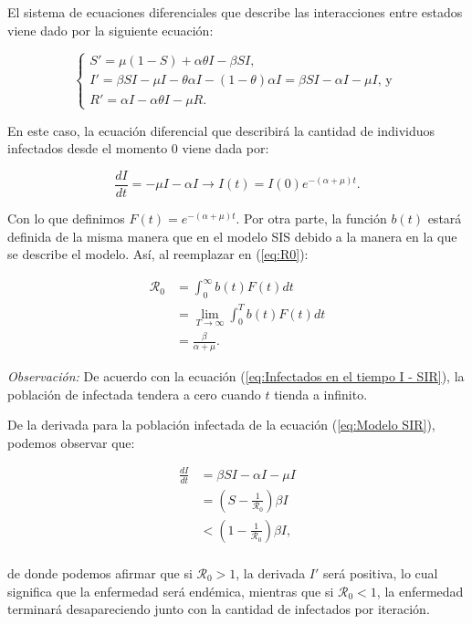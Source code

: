 El sistema de ecuaciones diferenciales que describe las interacciones entre estados viene dado por la siguiente ecuación:

\begin{equation}\label{eq:Modelo SIR}
\left\{
\begin{array}{l}
S' = \mu(1 - S) + \alpha\theta I - \beta S I, \\
I' = \beta S I - \mu I - \theta\alpha I - (1 - \theta)\alpha I = \beta S I - \alpha I - \mu I\text{, y } \\
R' = \alpha I - \alpha\theta I - \mu R.
\end{array}
\right.
\end{equation}

En este caso, la ecuación diferencial que describirá la cantidad de individuos infectados desde el momento 0 viene dada por:

\begin{equation}\label{eq:Infectados en el tiempo I - SIR}
    \frac{dI}{dt}=-\mu I - \alpha I \longrightarrow I(t)=I(0)e^{-(\alpha+\mu)t}.
\end{equation}

Con lo que definimos $F(t)=e^{-(\alpha+\mu)t}$. Por otra parte, la función $b(t)$ estará definida de la misma manera que en el modelo SIS debido a la manera en la que se describe el modelo. Así, al reemplazar en (\ref{eq:R0}):

\begin{align*}
\mathcal{R}_0 &= \int_0^\infty b(t)F(t) dt \\
&= \lim_{T\to\infty} \int_0^T b(t)F(t) dt \\
&= \frac{\beta}{\alpha+\mu}.
\end{align*}

\textit{Observación:} De acuerdo con la ecuación (\ref{eq:Infectados en el tiempo I - SIR}), la población de infectada tendera a cero cuando $t$ tienda a infinito.

De la derivada para la población infectada de la ecuación (\ref{eq:Modelo SIR}), podemos observar que:

\begin{align*}
    \frac{dI}{dt} &= \beta SI - \alpha I - \mu I \\
    &= \left(S-\frac{1}{\mathcal{R}_0}\right)\beta I \\
    &< \left(1-\frac{1}{\mathcal{R}_0}\right)\beta I, \\
\end{align*}

de donde podemos afirmar que si $\mathcal{R}_0>1$, la derivada $I'$ será positiva, lo cual significa que la enfermedad será endémica, mientras que si $\mathcal{R}_0<1$, la enfermedad terminará desapareciendo junto con la cantidad de infectados por iteración.

